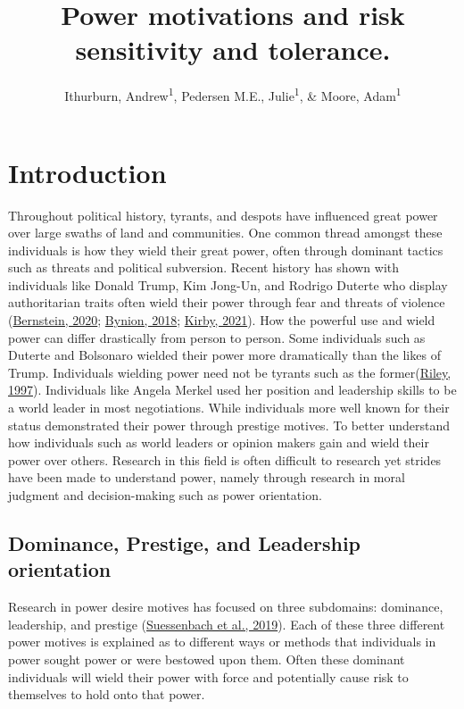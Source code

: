 \documentclass[
  donotrepeattitle,doc, 12pt, a4paper,floatsintext]{apa7}
\title{Power motivations and risk sensitivity and tolerance.}
\author{Ithurburn, Andrew\textsuperscript{1}, Pedersen M.E., Julie\textsuperscript{1}, \& Moore, Adam\textsuperscript{1}}
\date{}
\affiliation{\vspace{0.5cm}\textsuperscript{1} The University of Edinburgh}
\begin{document}
\maketitle

\hypertarget{introduction}{%
\section{Introduction}\label{introduction}}

Throughout political history, tyrants, and despots have influenced great power over large swaths of land and communities. One common thread amongst these individuals is how they wield their great power, often through dominant tactics such as threats and political subversion. Recent history has shown with individuals like Donald Trump, Kim Jong-Un, and Rodrigo Duterte who display authoritarian traits often wield their power through fear and threats of violence (\protect\hyperlink{ref-bernstein2020}{Bernstein, 2020}; \protect\hyperlink{ref-bynion2018}{Bynion, 2018}; \protect\hyperlink{ref-kirby2021}{Kirby, 2021}). How the powerful use and wield power can differ drastically from person to person. Some individuals such as Duterte and Bolsonaro wielded their power more dramatically than the likes of Trump. Individuals wielding power need not be tyrants such as the former(\protect\hyperlink{ref-riley1997}{Riley, 1997}). Individuals like Angela Merkel used her position and leadership skills to be a world leader in most negotiations. While individuals more well known for their status demonstrated their power through prestige motives. To better understand how individuals such as world leaders or opinion makers gain and wield their power over others. Research in this field is often difficult to research yet strides have been made to understand power, namely through research in moral judgment and decision-making such as power orientation.

\hypertarget{dominance-prestige-and-leadership-orientation}{%
\subsection{Dominance, Prestige, and Leadership orientation}\label{dominance-prestige-and-leadership-orientation}}

Research in power desire motives has focused on three subdomains: dominance, leadership, and prestige (\protect\hyperlink{ref-suessenbach2019}{Suessenbach et al., 2019}). Each of these three different power motives is explained as to different ways or methods that individuals in power sought power or were bestowed upon them. Often these dominant individuals will wield their power with force and potentially cause risk to themselves to hold onto that power.
\end{document}
